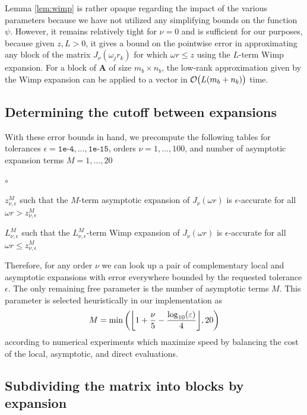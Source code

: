 Lemma \ref{lem:wimp} is rather opaque regarding the impact of the various
parameters because we have not utilized any simplifying bounds on the function
$\psi$. However, it remains relatively tight for $\nu = 0$ and is sufficient for
our purposes, because given $z, L > 0$, it gives a bound on the pointwise error
in approximating any block of the matrix $J_\nu(\omega_j r_k)$ for which $\omega
r \leq z$ using the $L$-term Wimp expansion. For a block of $\bm{A}$ of size
$m_b \times n_b$, the low-rank approximation given by the Wimp expansion can be
applied to a vector in $\mathcal{O}\big(L(m_b + n_b)\big)$ time.

\subsection{Determining the cutoff between expansions}

With these error bounds in hand, we precompute the following tables for
tolerances $\epsilon = \texttt{1e-4}, \dots, \texttt{1e-15}$, orders $\nu = 1,
\dots, 100$, and number of asymptotic expansion terms $M = 1, \dots, 20$
\begin{list}{$\circ$}{}
    \item $z_{\nu, \epsilon}^M$ such that the $M$-term asymptotic expansion of
    $J_\nu(\omega r)$ is $\epsilon$-accurate for all $\omega r > z_{\nu,
    \epsilon}^M$
    \item $L_{\nu, \epsilon}^M$ such that the $L_{\nu, \epsilon}^M$-term Wimp
    expansion of $J_\nu(\omega r)$ is $\epsilon$-accurate for all $\omega r \leq
    z_{\nu, \epsilon}^M$
\end{list}
Therefore, for any order $\nu$ we can look up a pair of complementary local and
asymptotic expansions with error everywhere bounded by the requested tolerance
$\epsilon$. The only remaining free parameter is the number of asymptotic terms
$M$. This parameter is selected heuristically in our implementation as 
\begin{align} \label{eq:num-asy-terms}
    M = \min\left(\flr{1 + \frac{\nu}{5} - \frac{\log_{10}(\epsilon)}{4}}, 20\right)
\end{align}
according to numerical experiments which maximize speed by balancing the cost of
the local, asymptotic, and direct evaluations.

\subsection{Subdividing the matrix into blocks by expansion}

